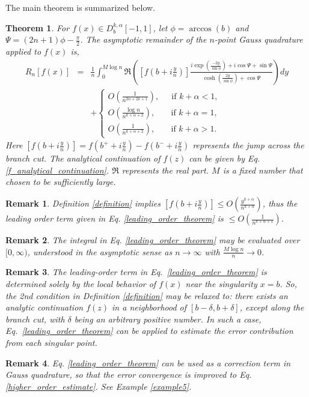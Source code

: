 \documentclass[11pt]{article}
\newtheorem{theorem}{Theorem}
\newtheorem{remark}{Remark}
\begin{document}
The main theorem is summarized below.
\begin{theorem} \label{main_theorem}
    For $f(x) \in D_b^{k,\alpha}[-1,1]$, let $\phi = \arccos(b)$ and $\Psi = (2n+1)\phi - \frac{\pi}{2}$. The asymptotic remainder of the $n$-point Gauss quadrature applied to $f(x)$ is,
    \begin{eqnarray}
        R_n[f(x)] &=& \frac{1}{ n} \int_{0}^{M \log n}  \Re\left(\left[ f(b+i\frac{y}{n})\right] \frac{  i\exp\left(\frac{-2y}{\sin\phi}\right) + i\cos \Psi + \sin \Psi  }{\cosh\left(\frac{2y}{\sin\phi}\right) + \cos \Psi}\right)
        dy \label{leading_order_theorem} \\ &&+\begin{cases}
        O(\frac{1}{n^{2\alpha+2k+1}}), \ \ \ \ \  \text{ if } k+\alpha <1,\\
        O(\frac{\log n}{n^{k+\alpha+2}}), \ \ \ \ \ \ \ \text{ if } k+\alpha =1,\\
        O(\frac{1}{n^{k+\alpha+2}}),\ \ \ \ \ \ \  \text{ if }  k+\alpha >1.
        \end{cases} \label{higher_order_estimate}
    \end{eqnarray}
    Here $\left[ f(b+i\frac{y}{n})\right]=f(b^++i\frac{y}{n})-f(b^-+i\frac{y}{n})$ represents the jump across the branch cut. The analytical continuation of $f(z)$ can be given by Eq. \eqref{f_analytical_continuation}. $\Re$ represents the real part. $M$ is a fixed number that chosen to be sufficiently large.
\end{theorem}

\begin{remark}\label{main_order}
    Definition \ref{definition} implies $\left[ f(b+i\frac{y}{n})\right]\leq O(\frac{y^{k+\alpha}}{n^{k+\alpha}})$, thus the leading order term given in Eq. \eqref{leading_order_theorem} is $\leq O(\frac{1}{n^{k+\alpha+1}})$.
\end{remark}

\begin{remark}
The integral in Eq. \eqref{leading_order_theorem} may be evaluated over $[0,\infty)$, understood in the asymptotic sense as  $n \to \infty$ with $\frac{M \log n}{n} \to 0$. \label{integral_infty}
\end{remark}

\begin{remark}
The leading-order term in Eq.~\eqref{leading_order_theorem} is determined solely by the local behavior of $f(x)$ near the singularity $x=b$. So, the 2nd condition in Definition \ref{definition} may be relaxed to: there exists an analytic continuation $f(z)$ in a neighborhood of $[b-\delta,b+\delta]$, except along the branch cut, with $\delta$ being an arbitrary positive number. In such a case, Eq.~\eqref{leading_order_theorem} can be applied to estimate the error contribution from each singular point.
\end{remark}
\begin{remark}
    Eq. \eqref{leading_order_theorem} can be used as a correction term in Gauss quadrature, so that the error convergence is improved to Eq. \eqref{higher_order_estimate}. See Example \ref{example5}.
\end{remark}
\end{document}
